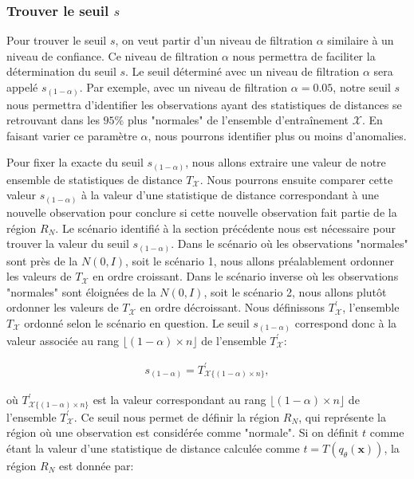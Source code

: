\subsubsection{Trouver le seuil $s$}

 Pour trouver le seuil $s$, on veut partir d'un niveau de filtration $\alpha$ similaire à un niveau de confiance. Ce niveau de filtration $\alpha$ nous permettra de faciliter la détermination du seuil $s$. Le seuil déterminé avec un niveau de filtration $\alpha$ sera appelé $s_{(1-\alpha)}$. Par exemple, avec un niveau de filtration $\alpha=0.05$, notre seuil $s$ nous permettra d'identifier les observations ayant des statistiques de distances se retrouvant dans les $95\%$ plus "normales" de l'ensemble d'entraînement $\mathcal{X}$. En faisant varier ce paramètre $\alpha$, nous pourrons identifier plus ou moins d'anomalies. 

Pour fixer la exacte du  seuil $s_{(1-\alpha)}$, nous allons extraire une valeur de notre ensemble de statistiques de distance $T_{\mathcal{X}}$. Nous pourrons ensuite comparer cette valeur $s_{(1-\alpha)}$ à la valeur d'une statistique de distance  correspondant à une nouvelle observation pour conclure si cette nouvelle observation fait partie de la région $R_N$. Le scénario identifié à la section précédente nous est nécessaire pour trouver la valeur du seuil $s_{(1-\alpha)}$. Dans le scénario où les observations "normales" sont près de la $N(0,I)$, soit le scénario 1, nous allons préalablement ordonner les valeurs de $T_{\mathcal{X}}$ en ordre croissant. Dans le scénario inverse où les observations "normales" sont éloignées de la $N(0,I)$, soit le scénario 2, nous allons plutôt ordonner les valeurs de $T_{\mathcal{X}}$ en ordre décroissant. Nous définissons $T^{'}_{\mathcal{X}}$, l'ensemble $T_{\mathcal{X}}$ ordonné selon le scénario en question. Le seuil $s_{(1-\alpha)}$ correspond donc à la valeur associée au rang $\lfloor(1 - \alpha) \times n\rfloor$ de l'ensemble $T^{'}_{\mathcal{X}}$:

\begin{gather} \label{eq:seuil}
s_{(1 - \alpha)} = T^{'}_{\mathcal{X} \{(1 - \alpha) \times n\}},
\end{gather}

où $T^{'}_{\mathcal{X} \{(1 - \alpha) \times n\}}$ est la valeur correspondant au rang $\lfloor(1 - \alpha) \times n\rfloor$ de l'ensemble $T^{'}_{\mathcal{X}}$. Ce seuil nous permet de définir la région $R_N$, qui représente la région où une observation est considérée comme "normale". Si on définit $t$ comme étant la valeur d'une statistique de distance calculée comme $t = T(q_\theta(\boldsymbol{x}))$, la région $R_N$ est donnée par:

